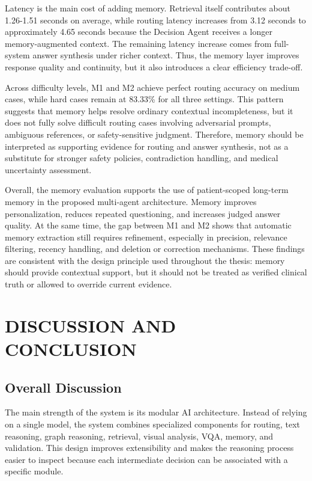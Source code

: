 Latency is the main cost of adding memory. Retrieval itself contributes about 1.26-1.51 seconds on average, while routing latency increases from 3.12 seconds to approximately 4.65 seconds because the Decision Agent receives a longer memory-augmented context. The remaining latency increase comes from full-system answer synthesis under richer context. Thus, the memory layer improves response quality and continuity, but it also introduces a clear efficiency trade-off.

Across difficulty levels, M1 and M2 achieve perfect routing accuracy on medium cases, while hard cases remain at 83.33\% for all three settings. This pattern suggests that memory helps resolve ordinary contextual incompleteness, but it does not fully solve difficult routing cases involving adversarial prompts, ambiguous references, or safety-sensitive judgment. Therefore, memory should be interpreted as supporting evidence for routing and answer synthesis, not as a substitute for stronger safety policies, contradiction handling, and medical uncertainty assessment.

Overall, the memory evaluation supports the use of patient-scoped long-term memory in the proposed multi-agent architecture. Memory improves personalization, reduces repeated questioning, and increases judged answer quality. At the same time, the gap between M1 and M2 shows that automatic memory extraction still requires refinement, especially in precision, relevance filtering, recency handling, and deletion or correction mechanisms. These findings are consistent with the design principle used throughout the thesis: memory should provide contextual support, but it should not be treated as verified clinical truth or allowed to override current evidence.


\chapter{DISCUSSION AND CONCLUSION}

\section{Overall Discussion}

The main strength of the system is its modular AI architecture. Instead of relying on a single model, the system combines specialized components for routing, text reasoning, graph reasoning, retrieval, visual analysis, VQA, memory, and validation. This design improves extensibility and makes the reasoning process easier to inspect because each intermediate decision can be associated with a specific module.

